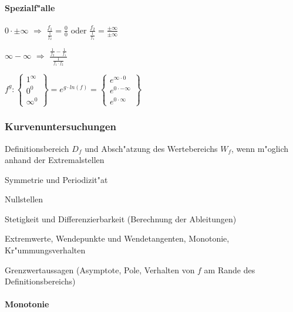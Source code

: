 \paragraph{Spezialf"alle}
	\begin{minipage}[c]{7cm} 
		$0 \cdot \pm \infty$ $\Rightarrow$ $\frac{f_1}{\frac{1}{f_2}} = \frac{0}{0}$ oder $\frac{f_2}{\frac{1}{f_1}} = \frac{\pm \infty}{\pm \infty}$
	\end{minipage}
	\begin{minipage}[c]{4cm} 
		$\infty - \infty$ $\Rightarrow$ $\frac{\frac{1}{f_2} - \frac{1}{f_1}}{\frac{1}{f_1 \cdot f_2}} $
	\end{minipage}
	\begin{minipage}[c]{7cm} 
		$ f^g:
		\left\{ 	
			\begin{array}{l} 
				1^\infty \\ 
				0^0 \\ 
				\infty^0 
			\end{array} 
		\right\} =
	  e^{g \cdot ln(f)} =
		\left\{ 
			\begin{array}{l} 
				e^{\infty \cdot 0} \\ 
				e^{0 \cdot -\infty} \\ 
				e^{0 \cdot \infty}
			\end{array}
		\right\} $
	\end{minipage}	

\subsubsection{Kurvenuntersuchungen }
	\begin{compactenum}
		\item Definitionsbereich $D_f$ und Absch"atzung des Wertebereichs $W_f$, wenn m"oglich anhand der Extremalstellen
		\item Symmetrie und Periodizit"at
		\item Nullstellen
		\item Stetigkeit und Differenzierbarkeit (Berechnung der Ableitungen)
		\item Extremwerte, Wendepunkte und Wendetangenten, Monotonie, Kr"ummungsverhalten
		\item Grenzwertaussagen (Asymptote, Pole, Verhalten von $f$ am Rande des Definitionsbereichs)
	\end{compactenum}

\paragraph{Monotonie} 
 	
